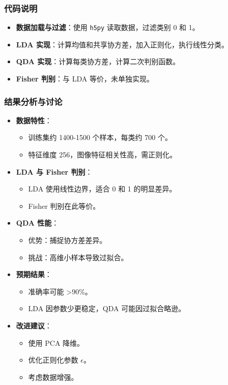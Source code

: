 \documentclass[UTF8]{report}
\theoremstyle{MyLineTheoremStyle} %
\theoremstyle{MyBlockTheoremStyle} %
\theoremstyle{MySubsubsectionStyle} %
\begin{document}
\subsubsection{代码说明}
\begin{itemize}
    \item \textbf{数据加载与过滤}：使用 \texttt{h5py} 读取数据，过滤类别 0 和 1。
    \item \textbf{LDA 实现}：计算均值和共享协方差，加入正则化，执行线性分类。
    \item \textbf{QDA 实现}：计算每类协方差，计算二次判别函数。
    \item \textbf{Fisher 判别}：与 LDA 等价，未单独实现。
\end{itemize}

\subsubsection{结果分析与讨论}
\begin{itemize}
    \item \textbf{数据特性}：
    \begin{itemize}
        \item 训练集约 1400-1500 个样本，每类约 700 个。
        \item 特征维度 256，图像特征相关性高，需正则化。
    \end{itemize}
    \item \textbf{LDA 与 Fisher 判别}：
    \begin{itemize}
        \item LDA 使用线性边界，适合 0 和 1 的明显差异。
        \item Fisher 判别在此等价。
    \end{itemize}
    \item \textbf{QDA 性能}：
    \begin{itemize}
        \item 优势：捕捉协方差差异。
        \item 挑战：高维小样本导致过拟合。
    \end{itemize}
    \item \textbf{预期结果}：
    \begin{itemize}
        \item 准确率可能 >90\%。
        \item LDA 因参数少更稳定，QDA 可能因过拟合略逊。
    \end{itemize}
    \item \textbf{改进建议}：
    \begin{itemize}
        \item 使用 PCA 降维。
        \item 优化正则化参数 \(\epsilon\)。
        \item 考虑数据增强。
    \end{itemize}
\end{itemize}
\end{document}
